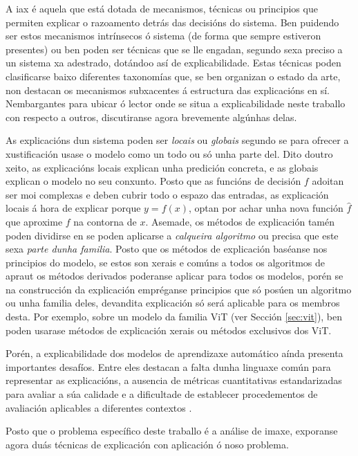 A \acrfull{iax} é aquela que está dotada de mecanismos, técnicas ou principios que permiten explicar o razoamento detrás das decisións do sistema. Ben puidendo ser estos mecanismos intrínsecos ó sistema (de forma que sempre estiveron presentes) ou ben poden ser técnicas que se lle engadan, segundo sexa preciso a un sistema xa adestrado, dotándoo así de \gls{explicabilidade}. Estas técnicas poden clasificarse baixo diferentes taxonomías que, se ben organizan o estado da arte, non destacan os mecanismos subxacentes á estructura das explicacións en sí. Nembargantes para ubicar ó lector onde se situa a \gls{explicabilidade} neste traballo con respecto a outros, discutiranse agora brevemente algúnhas delas.

As explicacións dun sistema poden ser \emph{locais} ou \emph{globais} segundo se para ofrecer a xustificación usase o modelo como un todo ou só unha parte del. Dito doutro xeito, as explicacións locais explican unha predición concreta, e as globais explican o modelo no seu conxunto. Posto que as funcións de decisión $f$ adoitan ser moi complexas e deben cubrir todo o espazo das entradas, as explicación locais á hora de explicar porque $y = f(x)$, optan por achar unha nova función $\hat f$ que aproxime $f$ na contorna de $x$. Asemade, os métodos de explicación tamén poden dividirse en se poden aplicarse a \emph{calqueira algoritmo} ou precisa que este sexa \emph{parte dunha familia}. Posto que os métodos de explicación baséanse nos principios do modelo, se estos son xerais e comúns a todos os algoritmos de \acrshort{apraut} os métodos derivados poderanse aplicar para todos os modelos, porén se na construcción da explicación empréganse principios que só posúen un algoritmo ou unha familia deles, devandita explicación só será aplicable para os membros desta. Por exemplo, sobre un modelo da familia ViT (ver Sección \ref{sec:vit}), ben poden usarase métodos de explicación xerais ou métodos exclusivos dos ViT.

Porén, a explicabilidade dos modelos de aprendizaxe automático aínda presenta importantes desafíos. Entre eles destacan a falta dunha linguaxe común para representar as explicacións, a ausencia de métricas cuantitativas estandarizadas para avaliar a súa calidade e a dificultade de establecer procedementos de avaliación aplicables a diferentes contextos \cite{pitfalsXAI}.

Posto que o problema específico deste traballo é a análise de imaxe, exporanse agora duás técnicas de explicación con aplicación ó noso problema.

